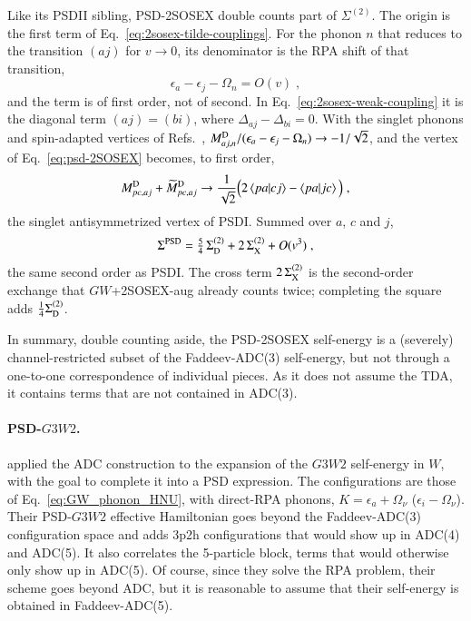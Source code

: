\documentclass[aip,jcp,reprint,noshowkeys,superscriptaddress]{revtex4-1}
\newcommand{\eps}{\epsilon}
\begin{document}
Like its PSDII sibling, PSD-2SOSEX double counts part of $\Sigma^{(2)}$.
The origin is the first term of Eq.~\eqref{eq:2sosex-tilde-couplings}.
For the phonon $n$ that reduces to the transition $(aj)$ for $v\to0$,
its denominator is the RPA shift of that transition,
\begin{equation}
\eps_a-\eps_j-\Omega_n
=
O(v) \;,
\nonumber
\end{equation}
and the term is of first order, not of second. In
Eq.~\eqref{eq:2sosex-weak-coupling} it is the diagonal term
$(aj)=(bi)$, where $\Delta_{aj}-\Delta_{bi}=0$. With the singlet
phonons and spin-adapted vertices of
Refs.~,
$M^{\rm D}_{aj,n}/(\eps_a-\eps_j-\Omega_n)\to-1/\sqrt2$, and the vertex of
Eq.~\eqref{eq:psd-2SOSEX} becomes, to first order,
\begin{equation}
M^{\rm D}_{pc,aj}+\widetilde M^{\rm D}_{pc,aj}
\to
\frac{1}{\sqrt2}\Big(2\braket{pa}{cj}-\braket{pa}{jc}\Big) \;,
\nonumber
\end{equation}
the singlet antisymmetrized vertex of PSDI. Summed over $a$, $c$ and
$j$,
\begin{equation}
\Sigma^{{\rm PSD}}
=
\tfrac54\,\Sigma^{(2)}_{\rm D}+2\,\Sigma^{(2)}_{\rm X}+O(v^3) \;,
\nonumber
\end{equation}
the same second order as PSDI. The cross term $2\,\Sigma^{(2)}_{\rm X}$
is the second-order exchange that $GW$+2SOSEX-aug already counts
twice;\cite{Bruneval2025} completing the square adds
$\frac14\Sigma^{(2)}_{\rm D}$. 

In summary, double counting aside,
the PSD-2SOSEX self-energy is a (severely) channel-restricted subset of
the Faddeev-ADC(3) self-energy, but not through a one-to-one 
correspondence of individual pieces. As it does not assume the TDA, 
it contains terms that are not contained in ADC(3).

\paragraph{PSD-$G3W2$.}
\citet{Marie2026} applied the ADC construction to the expansion of the
$G3W2$ self-energy in $W$, with the goal to complete it into a PSD expression.
The configurations are those of
Eq.~\eqref{eq:GW_phonon_HNU}, with direct-RPA phonons,
$K=\eps_a+\Omega_\nu$ ($\eps_i-\Omega_\nu$). Their PSD-$G3W2$ effective Hamiltonian 
goes beyond the Faddeev-ADC(3) configuration space and adds 
3p2h configurations that would show up in ADC(4) and ADC(5). It also 
correlates the 5-particle block, terms that would otherwise only show up in 
ADC(5). Of course, since they solve the RPA problem, their scheme goes beyond 
ADC, but it is reasonable to assume that their self-energy is obtained in 
Faddeev-ADC(5).
\end{document}
